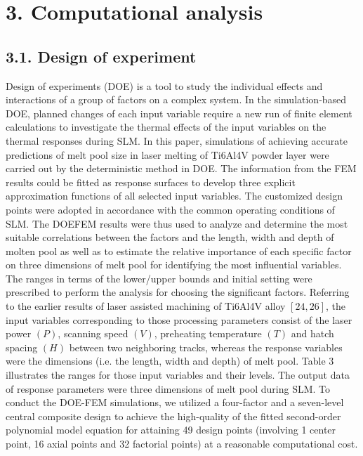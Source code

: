 \documentclass[10pt]{article}
\begin{document}
\section*{3. Computational analysis}
\subsection*{3.1. Design of experiment}
Design of experiments (DOE) is a tool to study the individual effects and interactions of a group of factors on a complex system. In the simulation-based DOE, planned changes of each input variable require a new run of finite element calculations to investigate the thermal effects of the input variables on the thermal responses during SLM. In this paper, simulations of achieving accurate predictions of melt pool size in laser melting of Ti6Al4V powder layer were carried out by the deterministic method in DOE. The information from the FEM results could be fitted as response surfaces to develop three explicit approximation functions of all selected input variables. The customized design points were adopted in accordance with the common operating conditions of SLM. The DOEFEM results were thus used to analyze and determine the most suitable correlations between the factors and the length, width and depth of molten pool as well as to estimate the relative importance of each specific factor on three dimensions of melt pool for identifying the most influential variables. The ranges in terms of the lower/upper bounds and initial setting were prescribed to perform the analysis for choosing the significant factors. Referring to the earlier results of laser assisted machining of Ti6Al4V alloy $[24,26]$, the input variables corresponding to those processing parameters consist of the laser power $(P)$, scanning speed $(V)$, preheating temperature $(T)$ and hatch spacing $(H)$ between two neighboring tracks, whereas the response variables were the dimensions (i.e. the length, width and depth) of melt pool. Table 3 illustrates the ranges for those input variables and their levels. The output data of response parameters were three dimensions of melt pool during SLM. To conduct the DOE-FEM simulations, we utilized a four-factor and a seven-level central composite design to achieve the high-quality of the fitted second-order polynomial model equation for attaining 49 design points (involving 1 center point, 16 axial points and 32 factorial points) at a reasonable computational cost.
\end{document}
